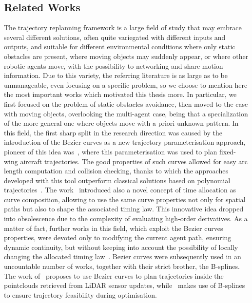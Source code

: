 \subsection{Related Works}
The trajectory replanning framework is a large field of study that may embrace several different solutions, often quite variegated
with different inputs and outputs, and suitable for different environmental conditions where only static obstacles are present,
where moving objects may suddenly appear, or where other robotic agents move, with the possibility to networking and share motion
information. Due to this variety, the referring literature is as large as to be unmanageable, even focusing on a specific problem,
so we choose to mention here the most important works which motivated this thesis more. In particular, we first focused on the problem
of static obstacles avoidance, then moved to the case with moving objects, overlooking the multi-agent case, being that a specialization
of the more general one where objects move with a priori unknown pattern.
In this field, the first sharp split in the research direction was caused by the introduction of the B\acuteacc ezier curves as a new trajectory
parameterisation approach, pioneer of this idea was~\cite{choe2015trajectory}, where this parameterisation was used to plan fixed-wing aircraft
trajectories. The good properties of such curves allowed for easy arc length computation and collision checking, thanks to which the approaches
developed with this tool outperform classical solutions based on polynomial trajectories~\cite{oleynikova2016continuous, richter2016polynomial}.
The work~\cite{choe2015trajectory} introduced also a novel concept of time allocation as curve composition, allowing to use the same curve properties
not only for spatial paths but also to shape the associated timing law. This innovative idea dropped into obsolescence due
to the complexity of evaluating high-order derivatives. As a matter of fact, further works in this field, which exploit the B\acuteacc ezier curves
properties, were devoted only to modifying the current agent path, ensuring dynamic continuity, but without keeping into account the possibility of
locally changing the allocated timing law~\cite{mehdi2015collision, mehdi2019collision}.
B\acuteacc ezier curves were subsequently used in an uncountable number of works, together with their strict brother, the B-splines.
The work of~\cite{gao2019flying} proposes to use B\acuteacc ezier curves to plan trajectories inside the pointclouds retrieved from LiDAR
sensor updates, while~\cite{zhou2021raptor} makes use of B-splines to ensure trajectory feasibility during optimisation.
